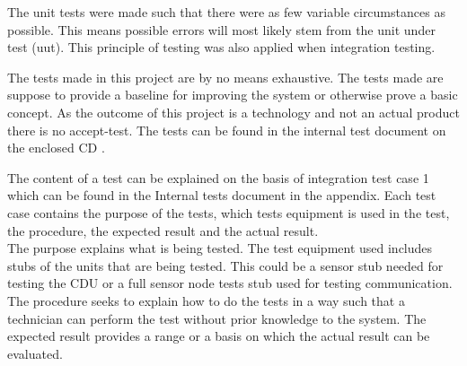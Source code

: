The unit tests were made such that there were as few variable circumstances as possible. This means possible errors will most likely stem from the unit under test (uut). This principle of testing was also applied when integration testing.

The tests made in this project are by no means exhaustive. The tests made are suppose to provide a baseline for improving the system or otherwise prove a basic concept. As the outcome of this project is a technology and not an actual product there is no accept-test. The tests can be found in the internal test document on the enclosed CD \cite{cd}.

The content of a test can be explained on the basis of integration test case 1 which can be found in the Internal tests document in the appendix. Each test case contains the purpose of the tests, which tests equipment is used in the test, the procedure, the expected result and the actual result.\\ 
The purpose explains what is being tested. The test equipment used includes stubs of the units that are being tested. This could be a sensor stub needed for testing the CDU or a full sensor node tests stub used for testing communication. The procedure seeks to explain how to do the tests in a way such that a technician can perform the test without prior knowledge to the system. The expected result provides a range or a basis on which the actual result can be evaluated.\\

